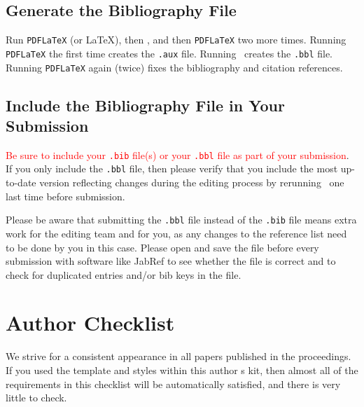 \documentclass{article}
\begin{document}
    
    
    

\subsection{Generate the Bibliography File}

Run \texttt{PDFLaTeX} (or \LaTeX), then \BibTeX, and then \texttt{PDFLaTeX} two more times. Running \texttt{PDFLaTeX} the first time creates the \texttt{.aux} file. Running \BibTeX\ creates the \texttt{.bbl} file.  Running \texttt{PDFLaTeX} again (twice) fixes the bibliography and citation references.


\subsection{Include the Bibliography File in Your Submission}
\label{sec:submitbib}

\textcolor{red}{Be sure to include your \texttt{.bib} file(s) or your \texttt{.bbl} file as part of your submission}. If you only include the \texttt{.bbl} file, then please verify that you include the most up-to-date version reflecting changes during the editing process by rerunning \BibTeX\ one last time before submission.

Please be aware that submitting the \texttt{.bbl} file instead of the \texttt{.bib} file means extra work for the editing team and for you, as any changes to the reference list need to be done by you in this case.
Please open and save the file before every submission with software like JabRef to see whether the file is correct and to check for duplicated entries and/or bib keys in the file.


\section{Author Checklist}
We strive for a consistent appearance in all papers published in the proceedings. If you used the template and styles within this author s kit, then almost all of the requirements in this checklist will be automatically satisfied, and there is very little to check.
\end{document}
